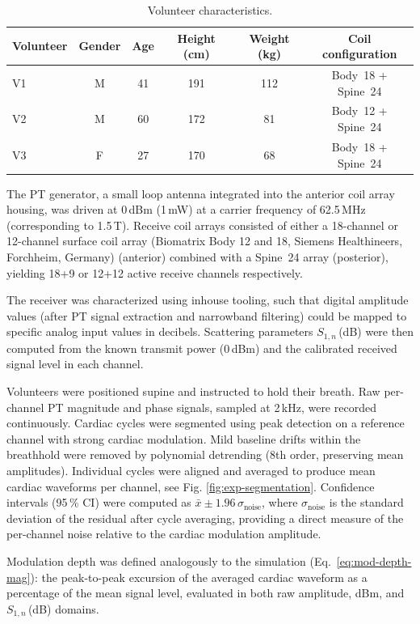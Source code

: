 \documentclass[
]{article}
\begin{document}
\begin{table}[htbp]
\centering
\caption{Volunteer characteristics.}
\label{tab:volunteers}
\begin{tabular}{lccccc}
\hline
Volunteer & Gender & Age & Height (cm) & Weight (kg) & Coil configuration \\
\hline
V1 & M & 41 & 191 & 112 & Body~18 + Spine~24 \\
V2 & M & 60 & 172 & 81 & Body~12 + Spine~24 \\
V3 & F & 27 & 170 & 68 & Body~18 + Spine~24 \\
\hline
\end{tabular}
\end{table}

The PT generator, a small loop antenna integrated into the anterior coil array housing, was driven at 0\,dBm (1\,mW) at a carrier frequency of 62.5\,MHz (corresponding to 1.5\,T). Receive coil arrays consisted of either a 18-channel or 12-channel surface coil array (Biomatrix Body 12 and 18, Siemens Healthineers, Forchheim, Germany) (anterior) combined with a Spine~24 array (posterior), yielding 18+9 or 12+12 active receive channels respectively.

The receiver was characterized using inhouse tooling, such that digital amplitude values (after PT signal extraction and narrowband filtering) could be mapped to specific analog input values in decibels.
Scattering parameters $S_{1,n}$\,(dB) were then computed from the known transmit power (0\,dBm) and the calibrated received signal level in each channel.

Volunteers were positioned supine and instructed to hold their breath. Raw per-channel PT magnitude and phase signals, sampled at 2\,kHz, were recorded continuously. Cardiac cycles were segmented using peak detection on a reference channel with strong cardiac modulation. Mild baseline drifts within the breathhold were removed by polynomial detrending (8th order, preserving mean amplitudes). Individual cycles were aligned and averaged to produce mean cardiac waveforms per channel, see Fig. \ref{fig:exp-segmentation}. Confidence intervals (95\,\% CI) were computed as $\bar{x} \pm 1.96\,\sigma_\mathrm{noise}$, where $\sigma_\mathrm{noise}$ is the standard deviation of the residual after cycle averaging, providing a direct measure of the per-channel noise relative to the cardiac modulation amplitude.

Modulation depth was defined analogously to the simulation (Eq.~\ref{eq:mod-depth-mag}): the peak-to-peak excursion of the averaged cardiac waveform as a percentage of the mean signal level, evaluated in both raw amplitude, dBm, and $S_{1,n}$\,(dB) domains.
\end{document}

